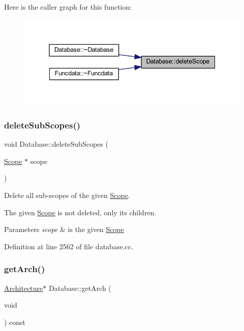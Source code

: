 Here is the caller graph for this function\+:
\nopagebreak
\begin{figure}[H]
\begin{center}
\leavevmode
\includegraphics[width=345pt]{class_database_aa7b4011d64dc04148fbf342819f38da5_icgraph}
\end{center}
\end{figure}
\mbox{\label{class_database_a7fcfc328de0a3f2d4ec8abdd6428213a}} 
\subsubsection{\texorpdfstring{deleteSubScopes()}{deleteSubScopes()}}
{\footnotesize\ttfamily void Database\+::delete\+Sub\+Scopes (\begin{DoxyParamCaption}\item[{\mbox{\hyperlink{class_scope}{Scope}} $\ast$}]{scope }\end{DoxyParamCaption})}



Delete all sub-\/scopes of the given \mbox{\hyperlink{class_scope}{Scope}}. 

The given \mbox{\hyperlink{class_scope}{Scope}} is not deleted, only its children. 
\begin{DoxyParams}{Parameters}
{\em scope} & is the given \mbox{\hyperlink{class_scope}{Scope}} \\
\hline
\end{DoxyParams}


Definition at line 2562 of file database.\+cc.

\mbox{\label{class_database_a40c66154335d11a4486067f92806bcac}} 
\subsubsection{\texorpdfstring{getArch()}{getArch()}}
{\footnotesize\ttfamily \mbox{\hyperlink{class_architecture}{Architecture}}$\ast$ Database\+::get\+Arch (\begin{DoxyParamCaption}\item[{void}]{ }\end{DoxyParamCaption}) const\hspace{0.3cm}{\ttfamily [inline]}}



